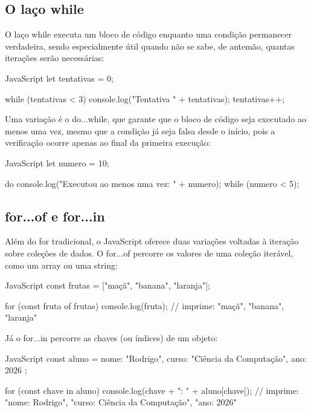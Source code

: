 \subsection{O laço while}

O laço while executa um bloco de código enquanto uma condição permanecer verdadeira, sendo especialmente útil quando não se sabe, de antemão, quantas iterações serão necessárias:

\begin{codebox}{JavaScript}
let tentativas = 0;

while (tentativas < 3) {
  console.log("Tentativa " + tentativas);
  tentativas++;
}
\end{codebox}

Uma variação é o do...while, que garante que o bloco de código seja executado ao menos uma vez, mesmo que a condição já seja falsa desde o início, pois a verificação ocorre apenas ao final da primeira execução:

\begin{codebox}{JavaScript}
let numero = 10;

do {
  console.log("Executou ao menos uma vez: " + numero);
} while (numero < 5);
\end{codebox}

\subsection{for...of e for...in}

Além do for tradicional, o JavaScript oferece duas variações voltadas à iteração sobre coleções de dados. O for...of percorre os valores de uma coleção iterável, como um array ou uma string:

\begin{codebox}{JavaScript}
const frutas = ["maçã", "banana", "laranja"];

for (const fruta of frutas) {
  console.log(fruta);
}
// imprime: "maçã", "banana", "laranja"
\end{codebox}

Já o for...in percorre as chaves (ou índices) de um objeto:

\begin{codebox}{JavaScript}
const aluno = { nome: "Rodrigo", curso: "Ciência da Computação", ano: 2026 };

for (const chave in aluno) {
  console.log(chave + ": " + aluno[chave]);
}
// imprime: "nome: Rodrigo", "curso: Ciência da Computação", "ano: 2026"
\end{codebox}

